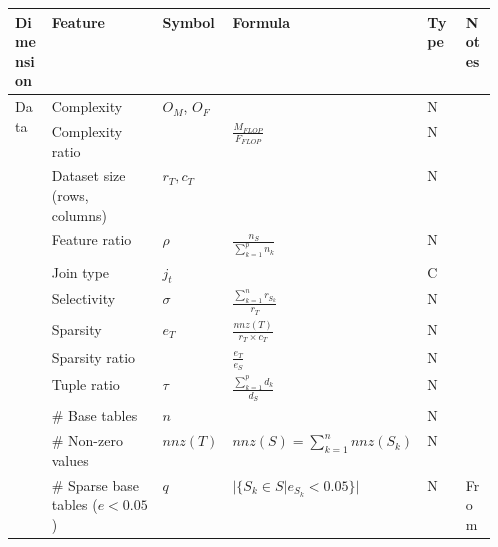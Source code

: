 \begin{tabular}{lp{0.23\linewidth}p{0.10\linewidth}>{\footnotesize}p{0.15\linewidth}p{0.08\linewidth}l}
    \toprule
    Dimension                    & Feature                                 & Symbol       & Formula                             & Type & Notes                  \\
    \midrule\midrule
    \multirow[t]{12}{*}{Data}    & Complexity                              & $O_M$, $O_F$ &                                     & N    &                        \\
                                 & Complexity ratio                        &              & $\frac{M_{FLOP}}{F_{FLOP}}$         & N    &                        \\
                                 & Dataset size (rows, columns)            & $r_T, c_T$   &                                     & N    &                        \\
                                 & Feature ratio                           & $\rho$       & $\frac{n_S}{\sum_{k=1}^p n_k} $     & N    &                        \\
                                 & Join type                               & $j_t$        &                                     & C    &                        \\
                                 & Selectivity                             & $\sigma$     & $\frac{\sum_{k=1}^{n}r_{S_k}}{r_T}$ & N    &                        \\
                                 & Sparsity                                & $e_T$        & $\frac{nnz(T)}{r_T\times c_T}$      & N    &                        \\
                                 & Sparsity ratio                          &              & $\frac{e_T}{e_S}$                   & N    &                        \\
                                 & Tuple ratio                             & $\tau$       & $\frac{\sum_{k=1}^p d_k}{d_S}$      & N    &                        \\
                                 & \# Base tables                          & $n$          &                                     & N    &                        \\
                                 & \# Non-zero values                      & $nnz(T)$     & $nnz(S) = \sum_{k=1}^{n}nnz(S_k)$   & N    &                        \\
                                 & \# Sparse base tables ($e < 0.05$)      & $q$          & $|\{S_k \in S| e_{S_k} < 0.05\}|$   & N    & From \cite{MorpheusFI} \\


\end{tabular}
